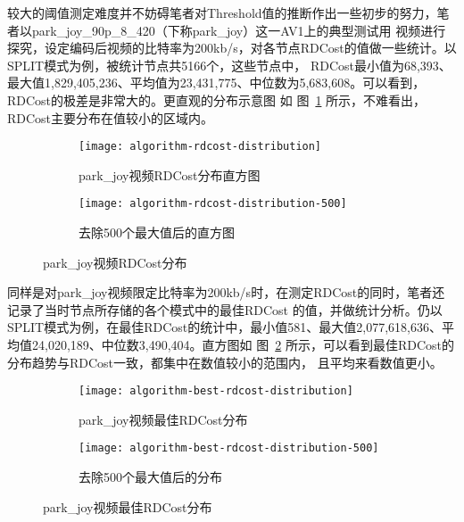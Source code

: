 较大的阈值测定难度并不妨碍笔者对Threshold值的推断作出一些初步的努力，笔者以park\_joy\_90p\_8\_420（下称park\_joy）这一AV1上的典型测试用
视频进行探究，设定编码后视频的比特率为200kb/s，对各节点RDCost的值做一些统计。以SPLIT模式为例，被统计节点共5166个，这些节点中，
RDCost最小值为68,393、最大值1,829,405,236、平均值为23,431,775、中位数为5,683,608。可以看到，RDCost的极差是非常大的。更直观的分布示意图
如 图~\ref{fig:algorithm-rdcost-distribution} 所示，不难看出，RDCost主要分布在值较小的区域内。

\begin{figure}[H]
  \centering%
  \begin{subfigure}{0.43\textwidth}
    \centering
    \texttt{[image: algorithm-rdcost-distribution]}
    \caption{park\_joy视频RDCost分布直方图}
  \end{subfigure}%
  \hspace{2em}%
  \begin{subfigure}{0.43\textwidth}
    \centering
    \texttt{[image: algorithm-rdcost-distribution-500]}
    \caption{去除500个最大值后的直方图}
  \end{subfigure}
  \caption{park\_joy视频RDCost分布}
  \label{fig:algorithm-rdcost-distribution}
\end{figure}

同样是对park\_joy视频限定比特率为200kb/s时，在测定RDCost的同时，笔者还记录了当时节点所存储的各个模式中的最佳RDCost
的值，并做统计分析。仍以SPLIT模式为例，在最佳RDCost的统计中，最小值581、最大值2,077,618,636、平均值24,020,189、中位数3,490,404。直方图如 
图~\ref{fig:algorithm-best-rdcost-distribution} 所示，可以看到最佳RDCost的分布趋势与RDCost一致，都集中在数值较小的范围内，
且平均来看数值更小。

\begin{figure}[H]
  \centering%
  \begin{subfigure}{0.43\textwidth}
    \centering
    \texttt{[image: algorithm-best-rdcost-distribution]}
    \caption{park\_joy视频最佳RDCost分布}
  \end{subfigure}%
  \hspace{2em}%
  \begin{subfigure}{0.43\textwidth}
    \centering
    \texttt{[image: algorithm-best-rdcost-distribution-500]}
    \caption{去除500个最大值后的分布}
  \end{subfigure}
  \caption{park\_joy视频最佳RDCost分布}
  \label{fig:algorithm-best-rdcost-distribution}
\end{figure}

